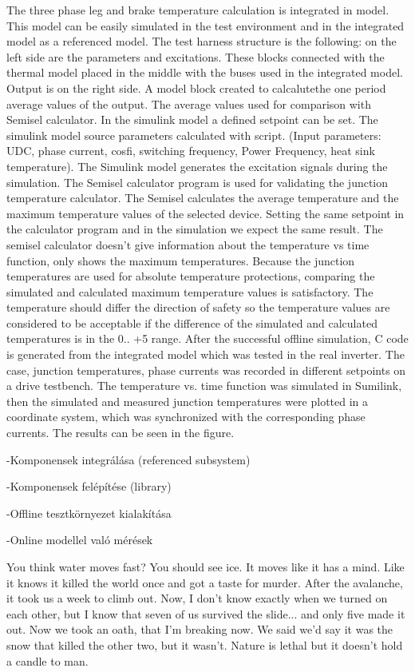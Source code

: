 The three phase leg and brake temperature calculation is integrated in model. This model can be easily simulated in the test environment and in the integrated model as a referenced model.
The test harness structure is the following: on the left side are the parameters and excitations. These blocks connected with the thermal model placed in the middle with the buses used in the integrated model. Output is on the right side. A model block created to calcalutethe one period average values of the output. The average values used for comparison with Semisel calculator. 
In the simulink model a defined setpoint can be set. The simulink model source parameters calculated with  script. (Input parameters: UDC, phase current, cosfi, switching frequency, Power Frequency, heat sink temperature). The Simulink model generates the excitation signals during the simulation.
The Semisel calculator program is used for validating the junction temperature calculator. The Semisel calculates the average temperature and the maximum temperature values of the selected device. Setting the same setpoint in the calculator program and in the simulation we expect the same result. The  semisel calculator doesn’t give information about the temperature vs time function, only shows the maximum temperatures. Because the junction temperatures are used for absolute temperature protections, comparing the simulated and calculated maximum temperature values is satisfactory. The temperature should differ the direction of safety so the temperature values are considered to be acceptable if the difference of the simulated and calculated temperatures is in the 0.. +5 range.
After the successful offline simulation, C code is generated from the integrated model which was tested in the real inverter.
The case, junction temperatures, phase currents was recorded in different setpoints on a drive testbench. The temperature vs. time function was simulated in Sumilink, then the simulated and measured junction temperatures were  plotted in a coordinate system, which was synchronized with the corresponding phase currents. The results can be seen in the figure.


-Komponensek integrálása (referenced subsystem)

-Komponensek felépítése (library)

-Offline tesztkörnyezet kialakítása

-Online modellel való mérések




You think water moves fast? You should see ice. It moves like it has a mind. Like it knows it killed the world once and got a taste for murder. After the avalanche, it took us a week to climb out. Now, I don't know exactly when we turned on each other, but I know that seven of us survived the slide... and only five made it out. Now we took an oath, that I'm breaking now. We said we'd say it was the snow that killed the other two, but it wasn't. Nature is lethal but it doesn't hold a candle to man.

